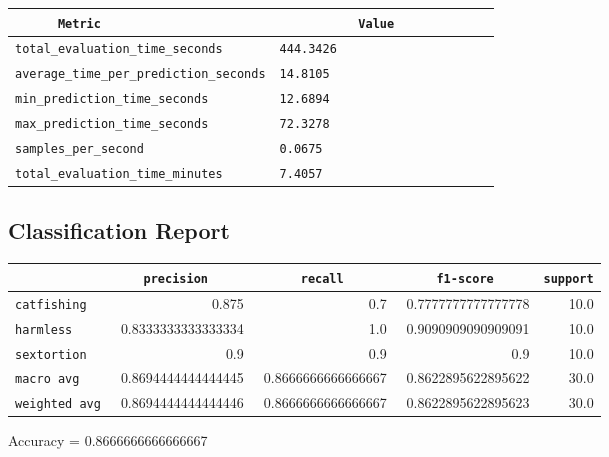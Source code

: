 \documentclass{article}
\begin{document}
\begin{center}
\begin{tabular}{l | l} \hline
    \verb|      Metric     | & \verb|           Value           | \\ \hline
    \hline
    \verb|total_evaluation_time_seconds| & \verb|444.3426                     | \\ \hline
    \verb|average_time_per_prediction_seconds| & \verb|14.8105                      | \\ \hline
    \verb|min_prediction_time_seconds| & \verb|12.6894                      | \\ \hline
    \verb|max_prediction_time_seconds| & \verb|72.3278                      | \\ \hline
    \verb|samples_per_second| & \verb|0.0675                       | \\ \hline
    \verb|total_evaluation_time_minutes| & \verb|7.4057                       | \\ \hline
\end{tabular}
\end{center}

\subsection{Classification Report}

\begin{center}
\begin{tabular}{l | r | r | r | r} \hline
    \verb|            | & \verb|    precision     | & \verb|      recall      | & \verb|     f1-score     | & \verb|support| \\ \hline
    \hline
    \verb|catfishing | & 0.875 & 0.7 & 0.7777777777777778 &    10.0 \\ \hline
    \verb|harmless   | & 0.8333333333333334 & 1.0 & 0.9090909090909091 &    10.0 \\ \hline
    \verb|sextortion | & 0.9 & 0.9 & 0.9 &    10.0 \\ \hline
    \verb|macro avg  | & 0.8694444444444445 & 0.8666666666666667 & 0.8622895622895622 &    30.0 \\ \hline
    \verb|weighted avg| & 0.8694444444444446 & 0.8666666666666667 & 0.8622895622895623 &    30.0 \\ \hline
\end{tabular}
\end{center}

\begin{center}
Accuracy = 0.8666666666666667
\end{center}
\end{document}
